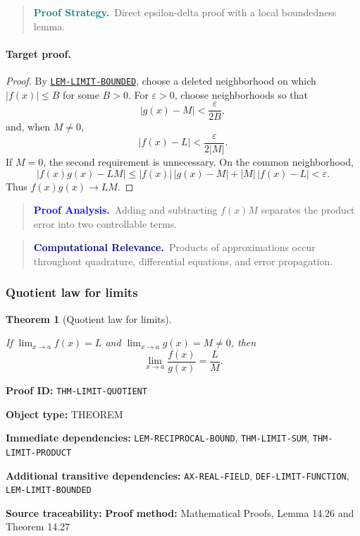 \documentclass[10pt]{article}
\newcommand{\pidraw}[1]{\begingroup\urlstyle{tt}\nolinkurl{#1}\endgroup}
\newcommand{\pidref}[1]{\hyperref[prf:#1]{\pidraw{#1}}}
\newcommand{\pid}[1]{\pidref{#1}}
\newtheorem{theorem}{Theorem}[section]
\theoremstyle{definition}
\theoremstyle{remark}
\newenvironment{proofstrategy}
{\begin{quote}\small\noindent\textbf{\textcolor{teal}{Proof Strategy.}}\ }
{\end{quote}}
\newenvironment{proofanalysis}
{\begin{quote}\small\noindent\textbf{\textcolor{blue}{Proof Analysis.}}\ }
{\end{quote}}
\newenvironment{computationalrelevance}
{\begin{quote}\small\noindent\textbf{\textcolor{navy}{Computational Relevance.}}\ }
{\end{quote}}
\newcommand{\meta}[2]{\noindent\textbf{#1:} #2\par}
\begin{document}
\begin{proofstrategy}Direct epsilon-delta proof with a local boundedness lemma.\end{proofstrategy}

\paragraph{Target proof.}

\begin{proof}

By \pid{LEM-LIMIT-BOUNDED}, choose a deleted neighborhood on which
$|f(x)|\le B$ for some $B>0$. For $\varepsilon>0$, choose neighborhoods so that
\[
|g(x)-M|<\frac{\varepsilon}{2B},
\]
and, when $M\ne0$,
\[
|f(x)-L|<\frac{\varepsilon}{2|M|}.
\]
If $M=0$, the second requirement is unnecessary. On the common neighborhood,
\[
|f(x)g(x)-LM|
\le |f(x)|\,|g(x)-M|+|M|\,|f(x)-L|<\varepsilon.
\]
Thus $f(x)g(x)\to LM$.

\end{proof}

\begin{proofanalysis}Adding and subtracting $f(x)M$ separates the product error into two controllable terms.\end{proofanalysis}

\begin{computationalrelevance}Products of approximations occur throughout quadrature, differential equations, and error propagation.\end{computationalrelevance}

\subsubsection{Quotient law for limits}

\begin{theorem}[Quotient law for limits]\label{prf:THM-LIMIT-QUOTIENT}

If $\lim_{x\to a}f(x)=L$ and $\lim_{x\to a}g(x)=M\ne0$, then
\[
\lim_{x\to a}\frac{f(x)}{g(x)}=\frac{L}{M}.
\]

\end{theorem}

\meta{Proof ID}{\pidraw{THM-LIMIT-QUOTIENT}}
\meta{Object type}{THEOREM}
\meta{Immediate dependencies}{\pidraw{LEM-RECIPROCAL-BOUND}, \pidraw{THM-LIMIT-SUM}, \pidraw{THM-LIMIT-PRODUCT}}
\meta{Additional transitive dependencies}{\pidraw{AX-REAL-FIELD}, \pidraw{DEF-LIMIT-FUNCTION}, \pidraw{LEM-LIMIT-BOUNDED}}
\meta{Source traceability}{\textbf{Proof method:} Mathematical Proofs, Lemma 14.26 and Theorem 14.27}
\end{document}
